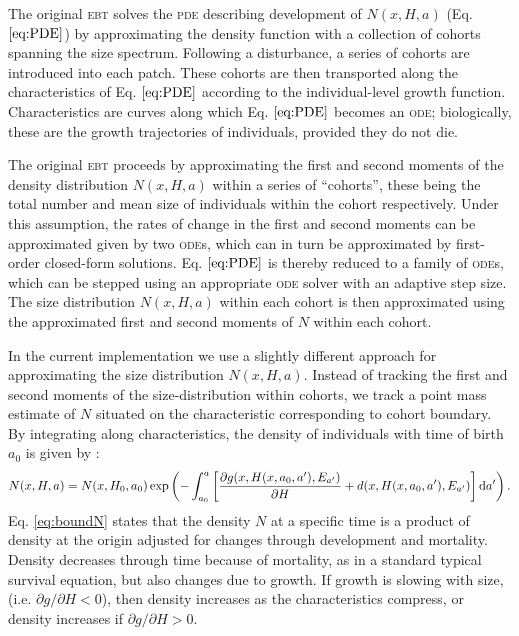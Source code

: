\documentclass[10pt,twoside]{article}
\begin{document}
The original \textsc{ebt} solves the \textsc{pde}
describing development of \(N(x, H, a)\) (Eq. \(\ref{eq:PDE}\)) by
approximating the density function with a collection of cohorts spanning
the size spectrum. Following a disturbance, a series of cohorts are
introduced into each patch. These cohorts are then transported along the
characteristics of Eq. \(\ref{eq:PDE}\) according to the
individual-level growth function. Characteristics are curves along which
Eq. \(\ref{eq:PDE}\) becomes an \textsc{ode};
biologically, these are the growth trajectories of individuals, provided
they do not die.

The original \textsc{ebt} \citep{Deroos-1997, Deroos-1992, Deroos-1988} proceeds
by approximating the first and second moments of the density
distribution \(N \left(x, H, a \right)\) within a series of ``cohorts'',
these being the total number
and mean size of individuals within the cohort respectively. Under this
assumption, the rates of change in the first and second moments can be approximated given by two
\textsc{ode}s, which can in turn be approximated by first-order closed-form
solutions. Eq. \(\ref{eq:PDE}\) is thereby reduced to a family of \textsc{ode}s,
which can be stepped using an appropriate \textsc{ode} solver with an adaptive
step size. The size distribution \(N(x, H, a)\) within each cohort is then
approximated using the approximated first and second moments of \(N\) within
each cohort.

In the current implementation we use a slightly different approach for
approximating the size distribution \(N(x, H, a)\). Instead of tracking
the first and second moments of the size-distribution within cohorts, we
track a point mass estimate of \(N\) situated on the characteristic
corresponding to cohort boundary. By integrating along characteristics,
the density of individuals with time of birth \(a_{0}\) is given by
\citep{Deroos-1997}:
\begin{equation}\label{eq:boundN}
  N(x, H, a) = N(x, H_0 , a_0)
   \exp \left( - \int _{a_0}^{a} \left[\frac{\partial g(x, H(x, a_0, a^\prime), E_{a^\prime})}{\partial H} + d(x, H(x, a_0, a^\prime), E_{a^\prime})\right] {\rm d} a^\prime \right).
\end{equation}
Eq. \ref{eq:boundN} states that the density \(N\) at a specific time is
a product of density at the origin adjusted for changes through
development and mortality. Density decreases through time because of
mortality, as in a standard typical survival equation, but also changes
due to growth. If growth is slowing with size, (i.e.
\(\partial g / \partial H < 0\)), then density increases as the
characteristics compress, or density increases if
\(\partial g / \partial H > 0\).
\end{document}
